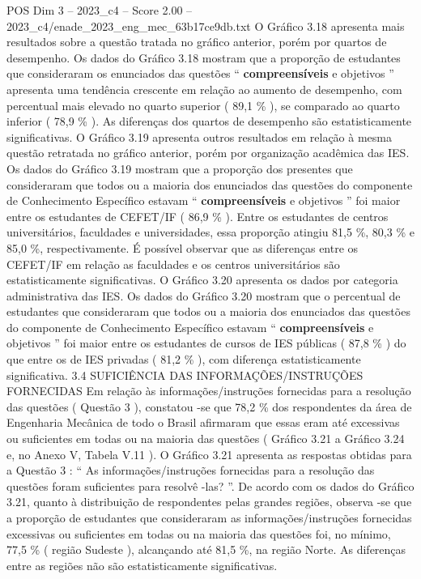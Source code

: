 \begin{textsample}{POS Dim 3 – 2023\_c4 – Score 2.00 – 2023\_c4/enade\_2023\_eng\_mec\_63b17ce9db.txt}
O Gráfico 3.18 apresenta mais resultados sobre a questão tratada no gráfico anterior, porém por quartos de desempenho.
Os dados do Gráfico 3.18 mostram que a proporção de estudantes que consideraram os enunciados das questões “ \textbf{compreensíveis} e objetivos ” apresenta uma tendência crescente em relação ao aumento de desempenho, com percentual mais elevado no quarto superior ( 89,1 \% ), se comparado ao quarto inferior ( 78,9 \% ).
As diferenças dos quartos de desempenho são estatisticamente significativas.
O Gráfico 3.19 apresenta outros resultados em relação à mesma questão retratada no gráfico anterior, porém por organização acadêmica das IES.
Os dados do Gráfico 3.19 mostram que a proporção dos presentes que consideraram que todos ou a maioria dos enunciados das questões do componente de Conhecimento Específico estavam “ \textbf{compreensíveis} e objetivos ” foi maior entre os estudantes de CEFET/IF ( 86,9 \% ).
Entre os estudantes de centros universitários, faculdades e universidades, essa proporção atingiu 81,5 \%, 80,3 \% e 85,0 \%, respectivamente.
É possível observar que as diferenças entre os CEFET/IF em relação as faculdades e os centros universitários são estatisticamente significativas.
O Gráfico 3.20 apresenta os dados por categoria administrativa das IES.
Os dados do Gráfico 3.20 mostram que o percentual de estudantes que consideraram que todos ou a maioria dos enunciados das questões do componente de Conhecimento Específico estavam “ \textbf{compreensíveis} e objetivos ” foi maior entre os estudantes de cursos de IES públicas ( 87,8 \% ) do que entre os de IES privadas ( 81,2 \% ), com diferença estatisticamente significativa. 3.4 SUFICIÊNCIA DAS INFORMAÇÕES/INSTRUÇÕES FORNECIDAS Em relação às informações/instruções fornecidas para a resolução das questões ( Questão 3 ), constatou -se que 78,2 \% dos respondentes da área de Engenharia Mecânica de todo o Brasil afirmaram que essas eram até excessivas ou suficientes em todas ou na maioria das questões ( Gráfico 3.21 a Gráfico 3.24 e, no Anexo V, Tabela V.11 ).
O Gráfico 3.21 apresenta as respostas obtidas para a Questão 3 : “ As informações/instruções fornecidas para a resolução das questões foram suficientes para resolvê -las? ”.
De acordo com os dados do Gráfico 3.21, quanto à distribuição de respondentes pelas grandes regiões, observa -se que a proporção de estudantes que consideraram as informações/instruções fornecidas excessivas ou suficientes em todas ou na maioria das questões foi, no mínimo, 77,5 \% ( região Sudeste ), alcançando até 81,5 \%, na região Norte.
As diferenças entre as regiões não são estatisticamente significativas.

\end{textsample}
